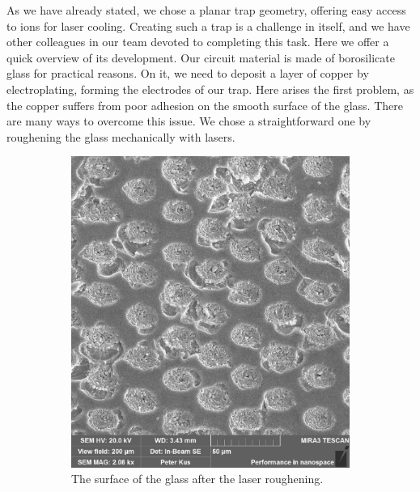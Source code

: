 As we have already stated, we chose a planar trap geometry, offering easy access to ions for laser cooling. Creating such a trap is a challenge in itself, and we have other colleagues in our team devoted to completing this task. Here we offer a quick overview of its development. Our circuit material is made of borosilicate glass for practical reasons. On it, we need to deposit a layer of copper by electroplating, forming the electrodes of our trap. Here arises the first problem, as the copper suffers from poor adhesion on the smooth surface of the glass. There are many ways to overcome this issue. We chose a straightforward one by roughening the glass mechanically with lasers.
\begin{figure}[H]
\begin{subfigure}{.45\textwidth}
	\centering
	\includegraphics[width=\linewidth]{img/200um_glass.pdf}
	\caption{The surface of the glass after the laser roughening.}
	\label{fig:glass}
\end{subfigure}\hfill%
\begin{subfigure}{.465\textwidth}
	\centering

\end{subfigure}
\end{figure}
